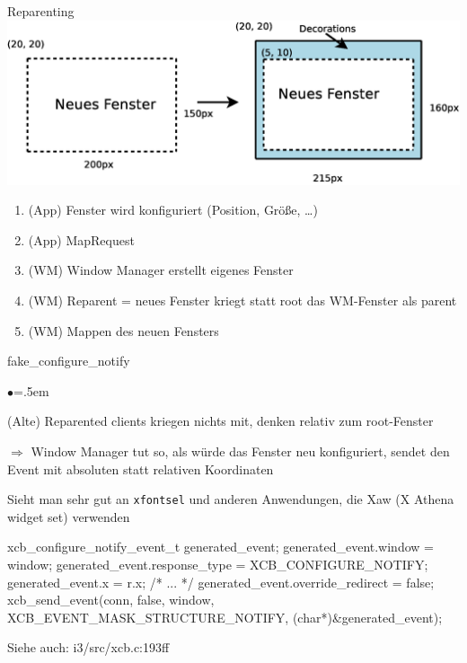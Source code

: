 \documentclass[mode=print,paper=screen,style=jefka]{powerdot}
\newcommand{\isrc}[1]{\begin{center} \footnotesize\ttfamily Siehe auch: #1 \end{center}}
\begin{document}
\begin{slide}[method=direct]{Reparenting}
\includegraphics[width=1\textwidth]{reparenting.eps}
\begin{enumerate}
        \item (App) Fenster wird konfiguriert (Position, Größe, …)
        \item (App) MapRequest
        \item (WM) Window Manager erstellt eigenes Fenster
        \item (WM) Reparent = neues Fenster kriegt statt root das WM-Fenster als parent
        \item (WM) Mappen des neuen Fensters
\end{enumerate}
\end{slide}

\begin{slide}[method=direct]{fake\_configure\_notify}
\begin{list}{$\bullet$}{\itemsep=.5em}
        \item (Alte) Reparented clients kriegen nichts mit, denken relativ zum root-Fenster
        \item $\Rightarrow$ Window Manager tut so, als würde das Fenster neu konfiguriert, sendet den Event mit absoluten statt relativen Koordinaten
        \item Sieht man sehr gut an \texttt{xfontsel} und anderen Anwendungen, die Xaw (X Athena widget set) verwenden
\end{list}
\begin{code}
        xcb_configure_notify_event_t generated_event;
        generated_event.window = window;
        generated_event.response_type = XCB_CONFIGURE_NOTIFY;
        generated_event.x = r.x;
        /* ... */
        generated_event.override_redirect = false;
        xcb_send_event(conn, false, window,
                       XCB_EVENT_MASK_STRUCTURE_NOTIFY,
                       (char*)&generated_event);
\end{code}
\isrc{i3/src/xcb.c:193ff}
\end{slide}
\end{document}
